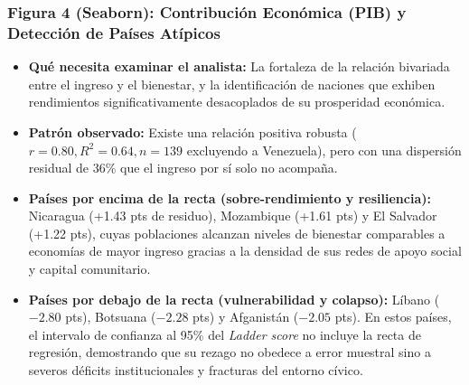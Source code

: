 \documentclass[11pt]{article}
\begin{document}
\subsubsection{Figura 4 (Seaborn): Contribución Económica (PIB) y Detección de Países Atípicos}
\begin{itemize}
    \item \textbf{Qué necesita examinar el analista:} La fortaleza de la relación bivariada entre el ingreso y el bienestar, y la identificación de naciones que exhiben rendimientos significativamente desacoplados de su prosperidad económica.
    \item \textbf{Patrón observado:} Existe una relación positiva robusta ($r = 0.80, R^2 = 0.64, n = 139$ excluyendo a Venezuela), pero con una dispersión residual de 36\% que el ingreso por sí solo no acompaña.
    \item \textbf{Países por encima de la recta (sobre-rendimiento y resiliencia):} Nicaragua (+1.43 pts de residuo), Mozambique (+1.61 pts) y El Salvador (+1.22 pts), cuyas poblaciones alcanzan niveles de bienestar comparables a economías de mayor ingreso gracias a la densidad de sus redes de apoyo social y capital comunitario.
    \item \textbf{Países por debajo de la recta (vulnerabilidad y colapso):} Líbano ($-2.80$ pts), Botsuana ($-2.28$ pts) y Afganistán ($-2.05$ pts). En estos países, el intervalo de confianza al 95\% del \textit{Ladder score} no incluye la recta de regresión, demostrando que su rezago no obedece a error muestral sino a severos déficits institucionales y fracturas del entorno cívico.
\end{itemize}
\end{document}
